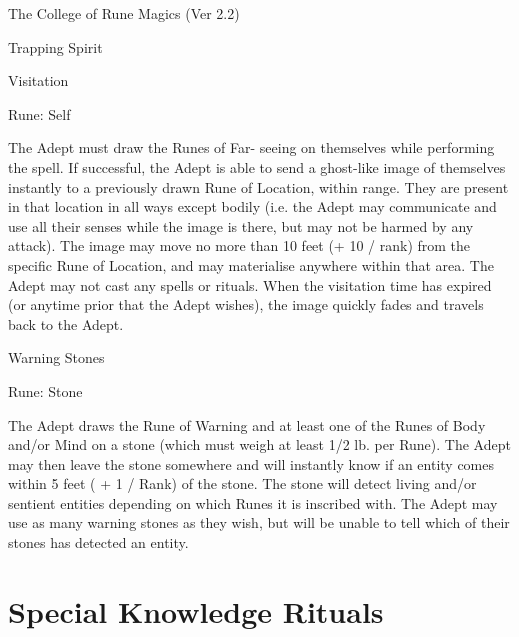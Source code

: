 \begin{Chapter}{The College of Rune Magics (Ver 2.2)}
\begin{spell}[S-15]{Trapping Spirit }
\begin{effects}
\end{effects}
\end{spell}

\begin{spell}[S-16]{Visitation }

Rune: Self 
\begin{effects}
 The  Adept  must  draw  the  Runes  of  Far-
seeing on themselves while performing the spell. If 
successful,  the  Adept  is  able  to  send  a  ghost-like 
image  of  themselves  instantly  to  a  previously 
drawn  Rune  of  Location,  within  range.  They  are 
present  in  that  location  in  all  ways  except  bodily 
(i.e.  the  Adept  may  communicate  and use  all  their 
senses  while  the  image  is  there,  but  may  not  be 
harmed  by  any  attack).  The  image  may  move  no 
more  than  10  feet  (+  10  /  rank)  from  the  specific 
Rune  of  Location,  and  may  materialise  anywhere 
within that area. The Adept may not cast any spells 
or rituals. When the visitation time has expired (or 
anytime  prior  that  the  Adept  wishes),  the  image 
quickly fades and travels back to the Adept. 

\end{effects}
\end{spell}

\begin{spell}[S-17]{Warning Stones }

Rune: Stone 
\begin{effects}
The Adept draws the Rune of Warning and 
at least one of the Runes of Body and/or Mind on a 
stone (which must weigh at least 1/2 lb. per Rune). 
The  Adept  may  then  leave  the  stone  somewhere 
and will instantly know if an entity comes within 5 
feet ( + 1 / Rank) of the stone. The stone will detect 
living  and/or  sentient  entities  depending  on  which 
Runes  it  is  inscribed  with.  The  Adept  may  use  as 
many  warning  stones  as  they  wish,  but  will  be 
unable to tell which of their stones has detected an 
entity. 


\end{effects}
\end{spell}

\section{Special Knowledge Rituals}


\end{Chapter}
